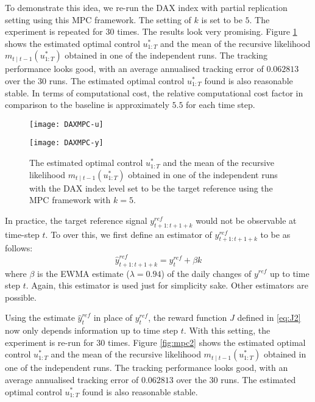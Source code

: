 To demonstrate this idea, we re-run the DAX index with partial replication setting using this MPC framework. The setting of $k$ is set to be $5$. The experiment is repeated for $30$ times. The results look very promising. Figure \ref{fig:mpc} shows the estimated optimal control $u^*_{1:T}$ and the mean of the recursive likelihood $m_{t \mid t-1}(u^*_{1:T})$ obtained in one of the independent runs. The tracking performance looks good, with an average annualised tracking error of $0.062813$ over the $30$ runs. The estimated optimal control $u^*_{1:T}$ found is also reasonable stable. In terms of computational cost, the relative computational cost factor in comparison to the baseline is approximately $5.5$ for each time step.
 
\begin{figure}[htbp]
\centering
    \begin{minipage}{0.5\textwidth}
        \centering
        \texttt{[image: DAXMPC-u]}
    \end{minipage}%
    \begin{minipage}{0.5\textwidth}
        \centering
        \texttt{[image: DAXMPC-y]}
    \end{minipage}
\caption{The estimated optimal control $u^*_{1:T}$ and the mean of the recursive likelihood $m_{t \mid t-1}(u^*_{1:T})$ obtained in one of the independent runs with the DAX index level set to be the target reference using the MPC framework with $k=5$.}
\label{fig:mpc}
\end{figure}

In practice, the target reference signal $y^{ref}_{t+1:t+1+k}$ would not be observable at time-step $t$. To over this, we first define an estimator of $y^{ref}_{t+1:t+1+k}$ to be as follows:
\begin{equation}
  \hat{y}^{ref}_{t+1:t+1+k} = y^{ref}_{t} + \beta k
\end{equation}
where $\beta$ is the EWMA estimate ($\lambda = 0.94$) of the daily changes of $y^{ref}$ up to time step $t$. Again, this estimator is used just for simplicity sake. Other estimators are possible.

Using the estimate $\hat{y}^{ref}_{t}$ in place of $y^{ref}_{t}$, the reward function $J$ defined in \eqref{eq:J2} now only depends information up to time step $t$. With this setting, the experiment is re-run for $30$ times. Figure \ref{fig:mpc2} shows the estimated optimal control $u^*_{1:T}$ and the mean of the recursive likelihood $m_{t \mid t-1}(u^*_{1:T})$ obtained in one of the independent runs. The tracking performance looks good, with an average annualised tracking error of $0.062813$ over the $30$ runs. The estimated optimal control $u^*_{1:T}$ found is also reasonable stable.

